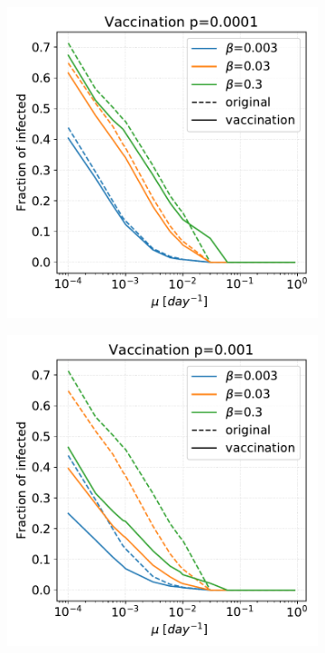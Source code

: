 \documentclass[a4paper,11pt, twocolumn]{article}
\begin{document}
\begin{figure}[t!]
\begin{subfigure}[t]{0.32\textwidth}
\centering
\includegraphics[scale=0.30]{./Figure/Simulations/SIS_vax/remove_0001.pdf}
\caption{}
\end{subfigure}
\begin{subfigure}[t]{0.32\textwidth}
\centering
\includegraphics[scale=0.30]{./Figure/Simulations/SIS_vax/remove_001.pdf}

\end{subfigure}
\end{figure}
\end{document}
